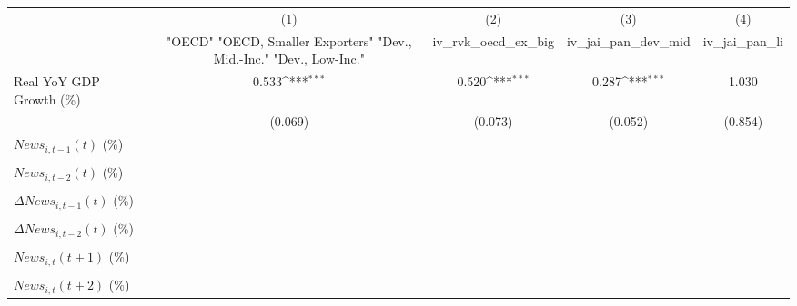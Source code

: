 {
\def\sym#1{\ifmmode^{#1}\else\(^{#1}\)\fi}
\begin{tabular}{l*{4}{c}}
\toprule
                    &\multicolumn{1}{c}{(1)}&\multicolumn{1}{c}{(2)}&\multicolumn{1}{c}{(3)}&\multicolumn{1}{c}{(4)}\\
                    &\multicolumn{1}{c}{ "OECD" "OECD, Smaller Exporters" "Dev., Mid.-Inc." "Dev., Low-Inc."}&\multicolumn{1}{c}{iv_rvk_oecd_ex_big}&\multicolumn{1}{c}{iv_jai_pan_dev_mid}&\multicolumn{1}{c}{iv_jai_pan_li}\\
\midrule
Real YoY GDP Growth (\%)&       0.533\sym{***}&       0.520\sym{***}&       0.287\sym{***}&       1.030         \\
                    &     (0.069)         &     (0.073)         &     (0.052)         &     (0.854)         \\
\addlinespace
$ News_{i,t-1}(t)$ (\%)&                     &                     &                     &                     \\
                    &                     &                     &                     &                     \\
\addlinespace
$ News_{i,t-2}(t)$ (\%)&                     &                     &                     &                     \\
                    &                     &                     &                     &                     \\
\addlinespace
$ \Delta News_{i,t-1}(t)$ (\%)&                     &                     &                     &                     \\
                    &                     &                     &                     &                     \\
\addlinespace
$ \Delta News_{i,t-2}(t)$ (\%)&                     &                     &                     &                     \\
                    &                     &                     &                     &                     \\
\addlinespace
$ News_{i,t}(t+1)$ (\%)&                     &                     &                     &                     \\
                    &                     &                     &                     &                     \\
\addlinespace
$ News_{i,t}(t+2)$ (\%)&                     &                     &                     &                     \\

\end{tabular}}
